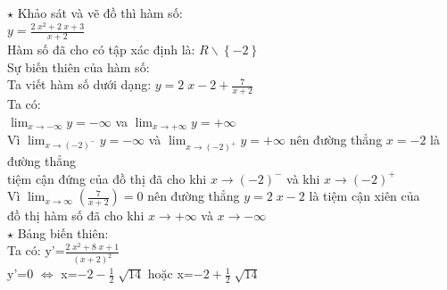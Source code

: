 \documentclass[17pt]{extarticle}
\begin{document}
\everymath{\displaystyle}
$\star$ Khảo sát và vẽ đồ thì hàm số: \\
$y=\frac{2 \; x^{2} + 2 \; x + 3}{x + 2}$\\
 Hàm số đã cho có tập xác định là: $R\backslash\left\{-2\right\}$\\
 Sự biến thiên của hàm số:\\
	Ta viết hàm số dưới dạng: $y=2 \; x - 2+\frac{7}{x + 2}$\\
 Ta có: \\
$\lim_{x\to -\infty }y=-\infty$ va $\lim_{x\to+\infty }y=+\infty$\\
 Vì $\lim_{x\to(-2)^{-} }y=-\infty$ và $\lim_{x\to(-2)^{+} }y=+\infty$ nên đường thẳng $x=-2$ là đường thẳng\\
tiệm cận đứng của đồ thị đã cho khi $x\to(-2)^{-}$ và khi $x\to(-2)^{+}$\\
 Vì $\lim_{x\to\infty}(\frac{7}{x + 2})=0$ nên đường thẳng $y=2 \; x - 2$ là tiệm cận xiên của\\
 đồ thị hàm số đã cho khi $x\to+\infty$ và $x\to-\infty$\\
$\star$ Bảng biến thiên:\\
 Ta có: y'=$\frac{2 \; x^{2} + 8 \; x + 1}{\left(x + 2\right)^{2}}$ \\
	y'=0 $\Leftrightarrow$ x=$-2 - \frac{1}{2} \; \sqrt{14}$ hoặc x=$-2 + \frac{1}{2} \; \sqrt{14}$ \\
\end{document}
